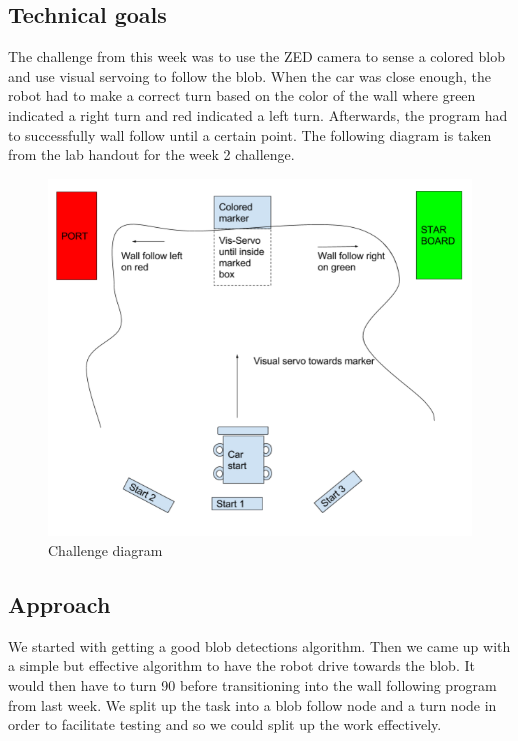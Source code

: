 \documentclass[journal, a4paper]{IEEEtran}
\begin{document}
\subsection{Technical goals}
The challenge from this week was to use the ZED camera to sense a colored blob and use visual servoing to follow the blob. When the car was close enough, the robot had to make a correct turn based on the color of the wall where green indicated a right turn and red indicated a left turn. Afterwards, the program had to successfully wall follow until a certain point. The following diagram is taken from the lab handout for the week 2 challenge. \\ 
\begin{figure}[H]
\includegraphics[scale=.42]{visual_servo.png}
\caption{Challenge diagram \cite{vs-handout}} 
\end{figure}
\subsection{Approach}
We started with getting a good blob detections algorithm. Then we came up with a simple but effective algorithm to have the robot drive towards the blob. It would then have to turn 90 \degree before transitioning into the wall following program from last week. We split up the task into a blob follow node and a turn node in order to facilitate testing and so we could split up the work effectively. 
\end{document}

